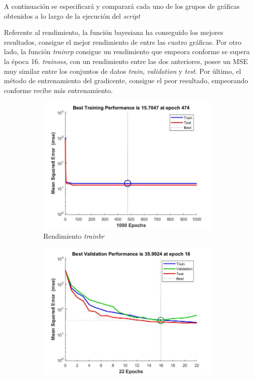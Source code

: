 \documentclass{article}
\begin{document}
A continuación se especificará y comparará cada uno de los grupos de gráficas
obtenidos a lo largo de la ejecución del \textit{script}

Referente al rendimiento, la función bayesiana ha conseguido los mejores
resultados, consigue el mejor rendimiento de entre las cuatro gráficas. Por otro
lado, la función \textit{trainrp} consigue un rendimiento que empeora conforme
se supera la época 16. \textit{trainoss}, con un rendimiento entre las dos
anteriores, posee un MSE muy similar entre los conjuntos de datos
\textit{train}, \textit{validation} y \textit{test}. Por último, el método de
entrenamiento del gradicente, consigue el peor resultado, empeorando conforme
recibe más entrenamiento.

\begin{figure}[H]
 \centering
 \begin{subfigure}{0.4\textwidth}
  \includegraphics[width=0.8\linewidth]{../images/I_ex3_performance_bodyfat_dataset_trainbr.jpg}
  \caption{Rendimiento \textit{trainbr}}
 \end{subfigure}
 \begin{subfigure}{0.4\textwidth}
  \includegraphics[width=0.8\linewidth]{../images/I_ex3_performance_bodyfat_dataset_trainrp.jpg}

\end{subfigure}
\end{figure}
\end{document}
